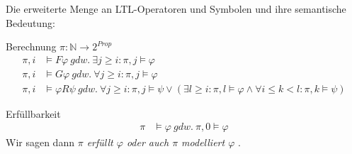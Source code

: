 \begin{frame}{\insertsubsection}
    Die erweiterte Menge an LTL-Operatoren und Symbolen und ihre semantische Bedeutung:
    \begin{block}{Berechnung $\pi : \mathbb{N} \rightarrow 2^{Prop}$}
    \vspace*{-1em}
    \begin{equation*}
        \begin{split}
            \pi, i &\models F\varphi\ gdw.\ \exists j \geq i: \pi, j \models \varphi\\
            \pi, i &\models G\varphi \ gdw.\ \forall j \geq i: \pi, j \models \varphi\\
            \pi, i &\models \varphi R\psi\ gdw.\ \forall j \geq i: \pi, j \models \psi \lor (\exists l \geq i: \pi, l \models \varphi \land \forall i \leq k < l: \pi, k \models \psi)
        \end{split}
    \end{equation*}
    \end{block}
    \begin{block}{Erfüllbarkeit}
    \vspace*{-1em}
    \begin{equation*}
        \begin{split}
            \pi &\models \varphi\ gdw.\ \pi, 0 \models \varphi
        \end{split}
    \end{equation*}
    Wir sagen dann \textit{$\pi$ erfüllt $\varphi$ oder auch $\pi$ modelliert $\varphi$} \cite{vardi+96}.
    \end{block}
\end{frame}